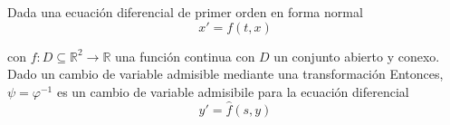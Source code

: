 \begin{prop}
    Dada una ecuación diferencial de primer orden en forma normal
    \begin{equation*}
        x' = f(t,x)
    \end{equation*}
    
    con $f:D\subseteq \mathbb{R}^2 \rightarrow\mathbb{R}$ una función continua con $D$ un conjunto abierto y conexo. Dado un cambio de variable admisible mediante una transformación
    Entonces, $\psi = \varphi^{-1}$ es un cambio de variable admisibile para la ecuación diferencial
    \begin{equation*}
        y' = \hat{f}(s,y)
    \end{equation*}
\end{prop}

